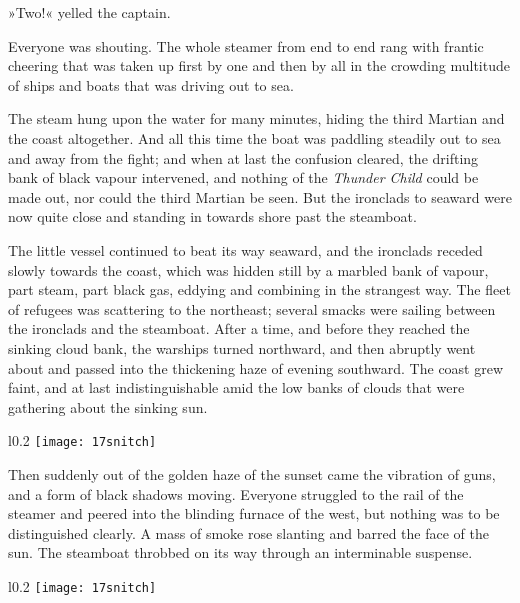 »Two!« yelled the captain.

Everyone was shouting. The whole steamer from end to end rang with frantic cheering that was taken up first by one and then by all in the crowding multitude of ships and boats that was driving out to sea.

The steam hung upon the water for many minutes, hiding the third Martian and the coast altogether. And all this time the boat was paddling steadily out to sea and away from the fight; and when at last the confusion cleared, the drifting bank of black vapour intervened, and nothing of the \textit{Thunder Child} could be made out, nor could the third Martian be seen. But the ironclads to seaward were now quite close and standing in towards shore past the steamboat.



The little vessel continued to beat its way seaward, and the ironclads receded slowly towards the coast, which was hidden still by a marbled bank of vapour, part steam, part black gas, eddying and combining in the strangest way. The fleet of refugees was scattering to the northeast; several smacks were sailing between the ironclads and the steamboat. After a time, and before they reached the sinking cloud bank, the warships turned northward, and then abruptly went about and passed into the thickening haze of evening southward. The coast grew faint, and at last indistinguishable amid the low banks of clouds that were gathering about the sinking sun.

\begin{letter}
	\begin{wrapfigure}{l}{0.2\textwidth}
		\centering
		\texttt{[image: 17snitch]}
	\end{wrapfigure}
\end{letter}

Then suddenly out of the golden haze of the sunset came the vibration of guns, and a form of black shadows moving. Everyone struggled to the rail of the steamer and peered into the blinding furnace of the west, but nothing was to be distinguished clearly. A mass of smoke rose slanting and barred the face of the sun. The steamboat throbbed on its way through an interminable suspense.

\begin{a4}
	\begin{wrapfigure}{l}{0.2\textwidth}
		\centering
		\texttt{[image: 17snitch]}
	\end{wrapfigure}
\end{a4}



